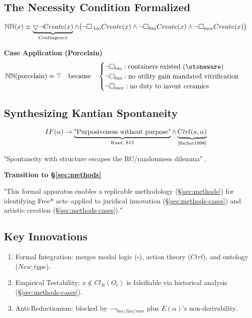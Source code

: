\documentclass[11pt,a4paper]{article}
\begin{document}
\subsection{The Necessity Condition Formalized}\label{sec:model-necessity}

\[
\mathbb{NN}(x)\equiv\underbrace{\bigtriangledown\neg Create(x)}_{\text{Contingency}}\wedge\bigl{(}\neg\square_{\text{ bio}}Create(x)\wedge\neg\square_{\text{fun}}Create(x)\wedge\neg\square_{\text{mor}}Create(x)\bigr{)}
\]

\textbf{Case Application (Porcelain)}
\[
\mathbb{NN}(\text{porcelain})=\top\quad\text{because}\quad\begin{cases}\neg\square _{\text{bio}}:\text{containers existed (\stoneware)}\\ \neg\square_{\text{fun}}:\text{no utility gain mandated vitrification}\\ \neg\square_{\text{mor}}:\text{no duty to invent ceramics}\end{cases}
\]
\cite[ p. 112]{kerr2024}

\subsection{Synthesizing Kantian Spontaneity}\label{sec:model-spontaneity}

\[
IF(\alpha)\to\underbrace{\text{"Purposiveness without purpose"}}_{\text{Kant, \$15}}\wedge\underbrace{Ctrl(a,\alpha)}_{\text{\cite{fischer1998}}}
\]

"Spontaneity with structure escapes the RC/randomness dilemma" \cite[ p. 392]{lavin2021}.

\textbf{Transition to \S\ref{sec:methods}}

"This formal apparatus enables a replicable methodology (\S\ref{sec:methods}) for identifying Free* acts--applied to juridical innovation (\S\ref{sec:methods-cases}) and artistic creation (\S\ref{sec:methods-cases})."

\subsection{Key Innovations}\label{sec:model-innovations}

\begin{enumerate}
  \item Formal Integration: merges modal logic (\(\square\)), action theory (\(Ctrl\)), and ontology (\(New\_type\)).
  \item Empirical Testability: \(x \notin Cl_R(O_t)\) is falsifiable via historical analysis (\S\ref{sec:methods-cases}).
  \item Anti-Reductionism: blocked by \(-\square_{bio/fun/mor}\) plus \(E(\alpha)\)'s non-derivability.
\end{enumerate}
\end{document}
